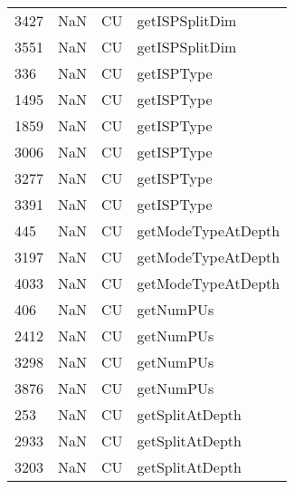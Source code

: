 \begin{tabular}{llll}
3427 &                   NaN &                         CU &                            getISPSplitDim \\
3551 &                   NaN &                         CU &                            getISPSplitDim \\
336  &                   NaN &                         CU &                                getISPType \\
1495 &                   NaN &                         CU &                                getISPType \\
1859 &                   NaN &                         CU &                                getISPType \\
3006 &                   NaN &                         CU &                                getISPType \\
3277 &                   NaN &                         CU &                                getISPType \\
3391 &                   NaN &                         CU &                                getISPType \\
445  &                   NaN &                         CU &                        getModeTypeAtDepth \\
3197 &                   NaN &                         CU &                        getModeTypeAtDepth \\
4033 &                   NaN &                         CU &                        getModeTypeAtDepth \\
406  &                   NaN &                         CU &                                 getNumPUs \\
2412 &                   NaN &                         CU &                                 getNumPUs \\
3298 &                   NaN &                         CU &                                 getNumPUs \\
3876 &                   NaN &                         CU &                                 getNumPUs \\
253  &                   NaN &                         CU &                           getSplitAtDepth \\
2933 &                   NaN &                         CU &                           getSplitAtDepth \\
3203 &                   NaN &                         CU &                           getSplitAtDepth \\

\end{tabular}
